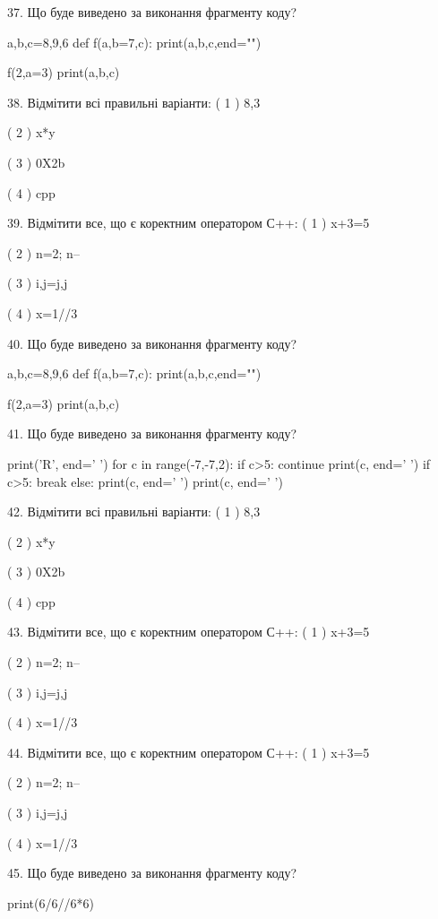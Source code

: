 \documentclass[11pt]{article}
\begin{document}

37. Що буде виведено за виконання фрагменту коду?

a,b,c=8,9,6
def f(a,b=7,c):
    print(a,b,c,end="")

f(2,a=3)
print(a,b,c)


38. Відмітити всі правильні варіанти:
( 1 ) 8,3

( 2 ) x*y

( 3 ) 0X2b

( 4 ) cpp

39. Відмітити все, що є коректним оператором С++:
( 1 ) x+3=5

( 2 ) n=2; n--

( 3 ) i,j=j,j

( 4 ) x=1//3

40. Що буде виведено за виконання фрагменту коду?

a,b,c=8,9,6
def f(a,b=7,c):
    print(a,b,c,end="")

f(2,a=3)
print(a,b,c)


41. Що буде виведено за виконання фрагменту коду?

print('R', end=' ')
for c in range(-7,-7,2):
    if c>5:
        continue
        print(c, end=' ')
    if c>5:
        break
    else:
        print(c, end=' ')
    print(c, end=' ')

42. Відмітити всі правильні варіанти:
( 1 ) 8,3

( 2 ) x*y

( 3 ) 0X2b

( 4 ) cpp

43. Відмітити все, що є коректним оператором С++:
( 1 ) x+3=5

( 2 ) n=2; n--

( 3 ) i,j=j,j

( 4 ) x=1//3

44. Відмітити все, що є коректним оператором С++:
( 1 ) x+3=5

( 2 ) n=2; n--

( 3 ) i,j=j,j

( 4 ) x=1//3

45. Що буде виведено за виконання фрагменту коду?

print(6/6//6*6)
\end{document}
